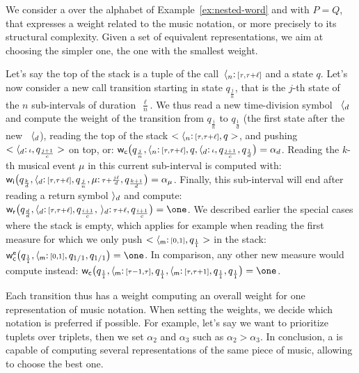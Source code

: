\begin{example} \label{ex:SWVPA}
We consider a \SWVPA over the alphabet of Example~\ref{ex:nested-word} and with $P = Q$,
that expresses a weight related to the music notation,
or more precisely to its structural complexity.
Given a set of equivalent representations, we aim at choosing the simpler one, \ie the one with the smallest weight.

Let's say the top of the stack is a tuple of the call~$\langle_{n}\mathpunct{:}{\scriptstyle [\tau, \tau+\ell]}$ and a state $q$. Let's now consider a new call transition starting in state $q_{\frac{j}{n}}$, that is the $j$-th state of the $n$ sub-intervals of duration~$\frac{\ell}{n}$.
We thus read a new time-division symbol ~$\langle_{d}$ and compute the weight of the transition from $q_{\frac{j}{n}}$ to $q_{\frac{1}{d}}$ (the first state after the new ~$\langle_{d}$), reading the top of the stack $<\langle_{n}\mathpunct{:}{\scriptstyle [\tau, \tau+\ell]}, q>$, and pushing $<\langle_{d}\mathpunct{:}{\scriptstyle \iota}, q_{\frac{j+1}{c}}>$ on top, or:
\(
{\mathsf{w}_\mathsf{c}}\bigl(q_{\frac{j}{n}},
           \langle_{n}\mathpunct{:}{\scriptstyle [\tau, \tau+\ell]}, q,
           \langle_{d}\mathpunct{:}{\scriptstyle \iota}, q_{\frac{j+1}{c}},
           q_{\frac{1}{d}} \bigr) = \alpha_d
\).
\noindent
Reading the $k$-th musical event $\mu$ in this current sub-interval is computed with:
\(
{\mathsf{w}_\mathsf{i}}\bigl(q_{\frac{k}{d}},
           \langle_{d}\mathpunct{:}{\scriptstyle [\tau, \tau+\ell]}, q_{\frac{j}{n}},
           \mu\mathpunct{:}{\scriptstyle \tau + \frac{j\ell}{d}}, q_{\frac{k+1}{d}} \bigr) = \alpha_\mu
\).
Finally, this sub-interval will end after reading a return symbol $\rangle_{d}$ and compute:
\(
\weir\bigl(q_{\frac{d}{d}},
           \ccall{d}\tstamp{[\tau, \tau+\ell]}, q_{\frac{i+1}{c}},
           \,\creturn{d}\tstamp{\tau + \ell}, q_{\frac{i+1}{c}} \bigr) = \one
\).
\noindent
We described earlier the special cases where the stack is empty, which applies for example when reading the first measure for which we only push $<\langle_{\mathsf{m}}\mathpunct{:}{\scriptstyle [0, 1]}, q_{\frac{1}{1}}>$ in the stack:
\(
\weiec\bigl(q_{\frac{1}{1}},
           \ccall{\mathsf{m}}\tstamp{[0, 1]}, q_{1/1},
           q_{1/1} \bigr) = \one
\).
In comparison, any other new measure would compute instead:
\(
\weic\bigl(q_{\frac{1}{1}},
          \ccall{\mathsf{m}}\tstamp{[\tau-1, \tau]}, q_{\frac{1}{1}},
          \ccall{\mathsf{m}}\tstamp{[\tau, \tau+1]}, q_{\frac{1}{1}},
          q_{\frac{1}{1}} \bigr) = \one
\).

Each transition thus has a weight computing an overall weight for one representation of music notation. 
When setting the weights, we decide which notation is preferred if possible. 
For example, let's say we want to prioritize tuplets over triplets, then we set $\alpha_2$ and $\alpha_3$ such as $\alpha_2 > \alpha_3$. In conclusion, a \SWVPA is capable of computing several representations of the same piece of music, allowing to choose the best one.
\endex
\end{example}

